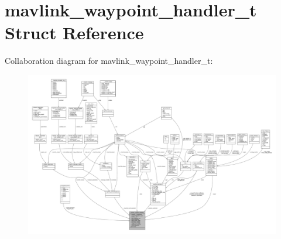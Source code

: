 \hypertarget{structmavlink__waypoint__handler__t}{\section{mavlink\+\_\+waypoint\+\_\+handler\+\_\+t Struct Reference}
\label{structmavlink__waypoint__handler__t}
}


Collaboration diagram for mavlink\+\_\+waypoint\+\_\+handler\+\_\+t\+:
\nopagebreak
\begin{figure}[H]
\begin{center}
\leavevmode
\includegraphics[width=350pt]{structmavlink__waypoint__handler__t__coll__graph}
\end{center}
\end{figure}
